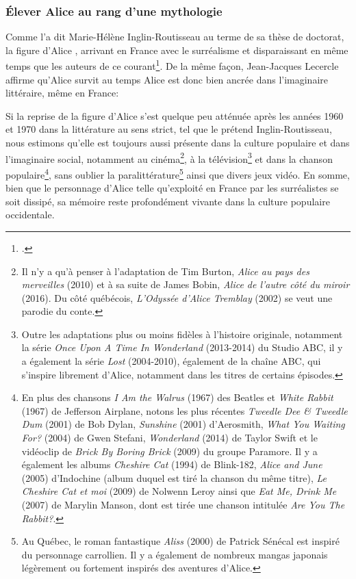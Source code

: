 \subsubsection{Élever Alice au rang d'une mythologie}
Comme l'a dit Marie-Hélène Inglin-Routisseau au terme de sa thèse de doctorat, la figure d'Alice , arrivant en France avec le surréalisme et disparaissant en même temps que les auteurs de ce courant\footcite[329]{Inglin-Routisseau2006}. De la même façon, Jean-Jacques Lecercle affirme qu'Alice survit au temps 
Alice est donc bien ancrée dans l'imaginaire littéraire, même en France: 
\par
Si la reprise de la figure d'Alice s'est quelque peu atténuée après les années 1960 et 1970 dans la littérature au sens strict, tel que le prétend Inglin-Routisseau, nous estimons qu'elle est toujours aussi présente dans la culture populaire et dans l'imaginaire social,
notamment au cinéma\footnote{Il n'y a qu'à penser à l'adaptation de Tim Burton, \textit{Alice au pays des merveilles} (2010) et à sa suite de James Bobin, \textit{Alice de l'autre côté du miroir} (2016). Du côté québécois, \textit{L'Odyssée d'Alice Tremblay} (2002) se veut une parodie du conte.},
à la télévision\footnote{Outre les adaptations plus ou moins fidèles à l'histoire originale, notamment la série \textit{Once Upon A Time In Wonderland} (2013-2014) du Studio ABC, il y a également la série \textit{Lost} (2004-2010), également de la chaîne ABC, qui s'inspire librement d'Alice, notamment dans les titres de certains épisodes.}
et dans la chanson populaire\footnote{En plus des chansons \textit{I Am the Walrus} (1967) des Beatles et \textit{White Rabbit} (1967) de Jefferson Airplane, notons les plus récentes \textit{Tweedle Dee \& Tweedle Dum} (2001) de Bob Dylan, \textit{Sunshine} (2001) d'Aerosmith, \textit{What You Waiting For?} (2004) de Gwen Stefani, \textit{Wonderland} (2014) de Taylor Swift et le vidéoclip de \textit{Brick By Boring Brick} (2009) du groupe Paramore. Il y a également les albums \textit{Cheshire Cat} (1994) de Blink-182, \textit{Alice and June} (2005) d'Indochine (album duquel est tiré la chanson du même titre), \textit{Le Cheshire Cat et moi} (2009) de Nolwenn Leroy ainsi que \textit{Eat Me, Drink Me} (2007) de Marylin Manson, dont est tirée une chanson intitulée \textit{Are You The Rabbit?}.},
sans oublier la paralittérature\footnote{Au Québec, le roman fantastique \textit{Aliss} (2000) de Patrick Sénécal est inspiré du personnage carrollien. Il y a également de nombreux mangas japonais légèrement ou fortement inspirés des aventures d'Alice.} ainsi que divers jeux vidéo.
En somme, bien que le personnage d'Alice telle qu'exploité en France par les surréalistes se soit dissipé, sa mémoire reste profondément vivante dans la culture populaire occidentale.

